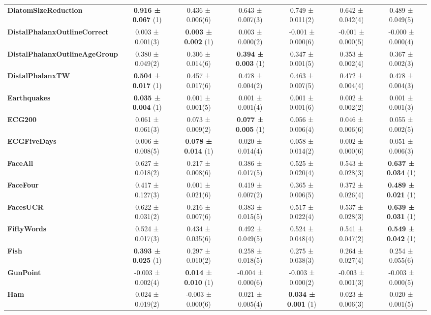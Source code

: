 \begin{table}[ht]
\begin{adjustbox}{width=\textwidth}
\begin{tabular}{lcccccc}
    \textbf{DiatomSizeReduction} & \textbf{0.916 ± 0.067} (1) & 0.436 ± 0.006(6) & 0.643 ± 0.007(3) & 0.749 ± 0.011(2) & 0.642 ± 0.042(4) & 0.489 ± 0.049(5) \\
    \textbf{DistalPhalanxOutlineCorrect} & 0.003 ± 0.001(3) & \textbf{0.003 ± 0.002} (1) & 0.003 ± 0.000(2) & -0.001 ± 0.000(6) & -0.001 ± 0.000(5) & -0.000 ± 0.000(4) \\
    \textbf{DistalPhalanxOutlineAgeGroup} & 0.380 ± 0.049(2) & 0.306 ± 0.014(6) & \textbf{0.394 ± 0.003} (1) & 0.347 ± 0.001(5) & 0.353 ± 0.002(4) & 0.367 ± 0.002(3) \\
    \textbf{DistalPhalanxTW} & \textbf{0.504 ± 0.017} (1) & 0.457 ± 0.017(6) & 0.478 ± 0.004(2) & 0.463 ± 0.007(5) & 0.472 ± 0.004(4) & 0.478 ± 0.004(3) \\
    \textbf{Earthquakes} & \textbf{0.035 ± 0.004} (1) & 0.001 ± 0.001(5) & 0.001 ± 0.001(4) & 0.001 ± 0.001(6) & 0.002 ± 0.002(2) & 0.001 ± 0.001(3) \\
    \textbf{ECG200} & 0.061 ± 0.061(3) & 0.073 ± 0.009(2) & \textbf{0.077 ± 0.005} (1) & 0.056 ± 0.006(4) & 0.046 ± 0.006(6) & 0.055 ± 0.002(5) \\
    \textbf{ECGFiveDays} & 0.006 ± 0.008(5) & \textbf{0.078 ± 0.014} (1) & 0.020 ± 0.014(4) & 0.058 ± 0.014(2) & 0.002 ± 0.000(6) & 0.051 ± 0.006(3) \\
    \textbf{FaceAll} & 0.627 ± 0.018(2) & 0.217 ± 0.008(6) & 0.386 ± 0.017(5) & 0.525 ± 0.020(4) & 0.543 ± 0.028(3) & \textbf{0.637 ± 0.034} (1) \\
    \textbf{FaceFour} & 0.417 ± 0.127(3) & 0.001 ± 0.021(6) & 0.419 ± 0.007(2) & 0.365 ± 0.006(5) & 0.372 ± 0.026(4) & \textbf{0.489 ± 0.021} (1) \\
    \textbf{FacesUCR} & 0.622 ± 0.031(2) & 0.216 ± 0.007(6) & 0.383 ± 0.015(5) & 0.517 ± 0.022(4) & 0.537 ± 0.028(3) & \textbf{0.639 ± 0.031} (1) \\
    \textbf{FiftyWords} & 0.524 ± 0.017(3) & 0.434 ± 0.035(6) & 0.492 ± 0.049(5) & 0.524 ± 0.048(4) & 0.541 ± 0.047(2) & \textbf{0.549 ± 0.042} (1) \\
    \textbf{Fish} & \textbf{0.393 ± 0.025} (1) & 0.297 ± 0.010(2) & 0.258 ± 0.018(5) & 0.275 ± 0.038(3) & 0.264 ± 0.027(4) & 0.254 ± 0.055(6) \\
    \textbf{GunPoint} & -0.003 ± 0.002(4) & \textbf{0.014 ± 0.010} (1) & -0.004 ± 0.000(6) & -0.003 ± 0.000(2) & -0.003 ± 0.001(3) & -0.003 ± 0.000(5) \\
    \textbf{Ham} & 0.024 ± 0.019(2) & -0.003 ± 0.000(6) & 0.021 ± 0.005(4) & \textbf{0.034 ± 0.001} (1) & 0.023 ± 0.006(3) & 0.020 ± 0.001(5) \\

\end{tabular}
\end{adjustbox}
\end{table}
